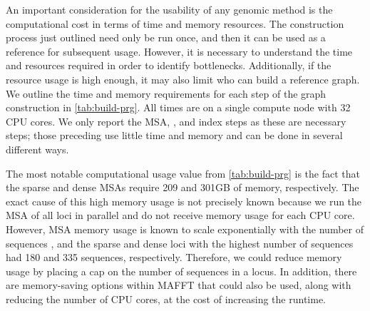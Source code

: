 An important consideration for the usability of any genomic method is the computational cost in terms of time and memory resources. The construction process just outlined need only be run once, and then it can be used as a reference for subsequent \pandora{} usage. However, it is necessary to understand the time and resources required in order to identify bottlenecks. Additionally, if the resource usage is high enough, it may also limit who can build a reference graph. We outline the time and memory requirements for each step of the graph construction in \autoref{tab:build-prg}. All times are on a single compute node with 32 CPU cores. We only report the MSA, \makeprg{}, and \pandora{} index steps as these are necessary steps; those preceding use little time and memory and can be done in several different ways.

\begin{table}
\centering
{}
\caption{Computational time and memory (RAM) usage for the main steps of building a \mtb{} reference graph. Sparse and Dense refer to two different densities with respect to the number of variants used. All steps were run on a single compute node with 32 CPU cores. MSA=multiple sequence alignment;PRG=population reference graph.}
\label{tab:build-prg}
\end{table}

The most notable computational usage value from \autoref{tab:build-prg} is the fact that the sparse and dense MSAs require 209 and 301GB of memory, respectively. The exact cause of this high memory usage is not precisely known because we run the MSA of all loci in parallel and do not receive memory usage for each CPU core. However, MSA memory usage is known to scale exponentially with the number of sequences \cite{Wang1994}, and the sparse and dense loci with the highest number of sequences had 180 and 335 sequences, respectively. Therefore, we could reduce memory usage by placing a cap on the number of sequences in a locus. In addition, there are memory-saving options within MAFFT that could also be used, along with reducing the number of CPU cores, at the cost of increasing the runtime.

